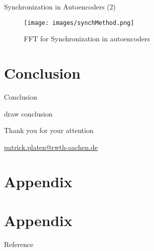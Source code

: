 \documentclass[xcolor=table,mathserif,9pt]{beamer}    %
\newcommand{\backupbegin}{
   \newcounter{finalframe}
   \setcounter{finalframe}{\value{framenumber}}
}
\newcommand{\backupend}{
   \setcounter{framenumber}{\value{finalframe}}
}
\newcommand{\stoptocwriting}{%
  \addtocontents{toc}{\protect\setcounter{tocdepth}{-5}}}
\newcommand{\resumetocwriting}{%
  \addtocontents{toc}{\protect\setcounter{tocdepth}{2}}}
\begin{document}
\begin{frame}{Synchronization in Autoencoders (2)}

\begin{figure}[htpb]
	\centering
	\texttt{[image: images/synchMethod.png]}
	\caption{FFT for Synchronization in autoencoders}
\end{figure}

\end{frame}

\section{Conclusion}
\begin{frame}{Conclusion}

draw conclusion

\end{frame}

\begin{frame}[label=finalSlide]
  \label{LastPage}%
  \begin{center}
    \vfill
    {\Large
    \textcolor{i6bluedark}{Thank you for your attention}
    }
    \vfill
    {\insertauthor}

    \vspace{10mm}
    \url{patrick.platen@rwth-aachen.de}
  \end{center}
\end{frame}

\nocite{*}

\stoptocwriting
\section{Appendix}
\resumetocwriting



\section*{Appendix}




\begin{frame}[allowframebreaks]
  \centerline{Reference}
 
 
\end{frame}

\end{document}
